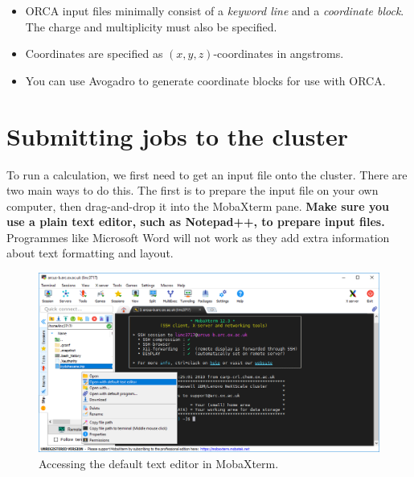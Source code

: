 \documentclass[10pt]{article}
\begin{document}
\begin{summary}
    \begin{itemize}[leftmargin=0.6cm]
        \item ORCA input files minimally consist of a \textit{keyword line} and a \textit{coordinate block}. The charge and multiplicity must also be specified.
        \item Coordinates are specified as \((x, y, z)\)-coordinates in angstroms.
        \item You can use Avogadro to generate coordinate blocks for use with ORCA.
    \end{itemize}
\end{summary}


\section{Submitting jobs to the cluster}

To run a calculation, we first need to get an input file onto the cluster. There are two main ways to do this. The first is to prepare the input file on your own computer, then drag-and-drop it into the MobaXterm pane. \textbf{Make sure you use a plain text editor, such as Notepad++, to prepare input files.} Programmes like Microsoft Word will not work as they add extra information about text formatting and layout.

\begin{figure}[H]
    \centering
    \includegraphics[scale=0.4]{./img/texteditor}
    \caption{Accessing the default text editor in MobaXterm.}
    \label{fig:texteditor}
\end{figure}
\end{document}
